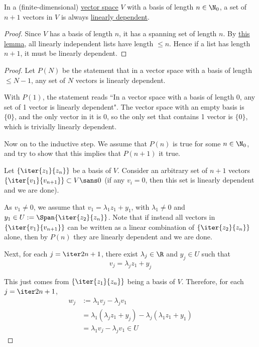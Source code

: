 \label{e054922}

In a (finite-dimensional) \href{fc83050}{vector space} $V$ with a basis of
length $n\in\N_0$, a set of $n+1$ vectors in $V$ is always
\href{c133a44}{linearly dependent}.

\begin{proof}
  Since $V$ has a basis of length $n$, it has a spanning set of length $n$. By
  \href{d8487b6}{this lemma}, all linearly independent lists have length $\leq
  n$. Hence if a list has length $n+1$, it must be linearly dependent.
\end{proof}

\begin{proof}
  \def\V{\{\iter{v_1}{v_{n+1}}\}}
  \def\Z#1{\{\iter{z_#1}{z_n}\}}

  Let $P(N)$ be the statement that in a vector space with a basis of length
  $\leq N-1$, any set of $N$ vectors is linearly dependent.

  With $P(1)$, the statement reads ``In a vector space with a basis of length
  0, any set of 1 vector is linearly dependent". The vector space with an empty
  basis is $\{0\}$, and the only vector in it is $0$, so the only set that
  contains 1 vector is $\{0\}$, which is trivially linearly dependent.

  Now on to the inductive step. We assume that $P(n)$ is true for some
  $n\in\N_0$, and try to show that this implies that $P(n+1)$ it true.

  Let $\Z1$ be a basis of $V$. Consider an arbitrary set of $n+1$ vectors
  $\V\subset V\sans0$ (if any $v_i=0$, then this set is linearly dependent and
  we are done).

  As $v_1\neq0$, we assume that $v_1=\lambda_1z_1+y_1$, with $\lambda_1\neq0$
  and $y_1\in U:=\Span\Z2$. Note that if instead all vectors in $\V$ can be
  written as a linear combination of $\Z2$ alone, then by $P(n)$ they are
  linearly dependent and we are done.

  Next, for each $j=\iter2{n+1}$, there exist $\lambda_j\in\R$ and $y_j\in U$
  such that
  $$
    v_j=\lambda_jz_1+y_j
  $$

  This just comes from $\Z1$ being a basis of $V$. Therefore, for each
  $j=\iter2{n+1}$,
  \begin{align*}
    w_j &:=\lambda_1v_j-\lambda_jv_1                              \\
        &=\lambda_1(\lambda_jz_1+y_j)-\lambda_j(\lambda_1z_1+y_1) \\
        &=\lambda_1v_j-\lambda_jv_1\in U
  \end{align*}


\end{proof}
